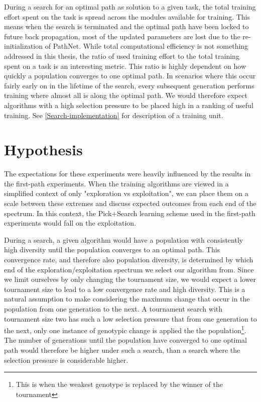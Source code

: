 During a search for an optimal path as solution to a given task, the total training effort spent on the task is spread across the modules available for training. This means when the search is terminated and the optimal path have been locked to future back propagation, most of the updated parameters are lost due to the re-initialization of PathNet. While total computational efficiency is not something addressed in this thesis, the ratio of used training effort to the total training spent on a task is an interesting metric. This ratio is highly dependent on how quickly a population converges to one optimal path. In scenarios where this occur fairly early on in the lifetime of the search, every subsequent generation performs training where almost all is along the optimal path. We would therefore expect algorithms with a high selection pressure to be placed high in a ranking of useful training. See \ref{Search-implementation} for description of a training unit. 

\section{Hypothesis}\label{Search-hypothesis}
The expectations for these experiments were heavily influenced by the results in the first-path experiments. When the training algorithms are viewed in a simplified context of only "exploration vs exploitation", we can place them on a scale between these extremes and discuss expected outcomes from each end of the spectrum. In this context, the Pick+Search learning scheme used in the first-path experiments would fall on the exploitation.

During a search, a given algorithm would have a population with consistently high diversity until the population converges to an optimal path. This convergence rate, and therefore also population diversity, is determined by which end of the exploration/exploitation spectrum we select our algorithm from. Since we limit ourselves by only changing the tournament size, we would expect a lower tournament size to lead to a low convergence rate and high diversity. This is a natural assumption to make considering the maximum change that occur in the population from one generation to the next. A tournament search with tournament size two has such a low selection pressure that from one generation to the next, only one instance of genotypic change is applied the the population\footnote{This is when the weakest genotype is replaced by the winner of the tournament}. The number of generations until the population have converged to one optimal path would therefore be higher under such a search, than a search where the selection pressure is considerable higher. 

